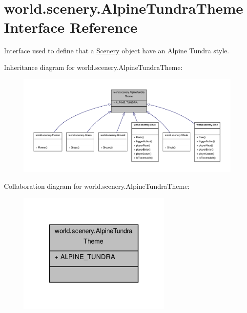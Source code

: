 \hypertarget{interfaceworld_1_1scenery_1_1_alpine_tundra_theme}{\section{world.\-scenery.\-Alpine\-Tundra\-Theme Interface Reference}
\label{interfaceworld_1_1scenery_1_1_alpine_tundra_theme}
}


Interface used to define that a \hyperlink{classworld_1_1scenery_1_1_scenery}{Scenery} object have an Alpine Tundra style.  




Inheritance diagram for world.\-scenery.\-Alpine\-Tundra\-Theme\-:
\nopagebreak
\begin{figure}[H]
\begin{center}
\leavevmode
\includegraphics[width=350pt]{interfaceworld_1_1scenery_1_1_alpine_tundra_theme__inherit__graph}
\end{center}
\end{figure}


Collaboration diagram for world.\-scenery.\-Alpine\-Tundra\-Theme\-:
\nopagebreak
\begin{figure}[H]
\begin{center}
\leavevmode
\includegraphics[width=216pt]{interfaceworld_1_1scenery_1_1_alpine_tundra_theme__coll__graph}
\end{center}
\end{figure}
